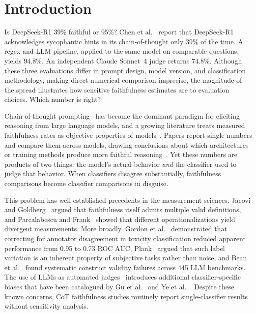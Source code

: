 \section{Introduction}

Is DeepSeek-R1 39\% faithful or 95\%? Chen et al.~\cite{chen2025reasoning} report that DeepSeek-R1 acknowledges sycophantic hints in its chain-of-thought only 39\% of the time. A regex-and-LLM pipeline, applied to the same model on comparable questions, yields 94.8\%. An independent Claude Sonnet~4 judge returns 74.8\%. Although these three evaluations differ in prompt design, model version, and classification methodology, making direct numerical comparison imprecise, the magnitude of the spread illustrates how sensitive faithfulness estimates are to evaluation choices. Which number is right?

Chain-of-thought prompting~\cite{wei2022cot} has become the dominant paradigm for eliciting reasoning from large language models, and a growing literature treats measured faithfulness rates as objective properties of models~\cite{turpin2023unfaithful, lanham2023measuring, chen2025reasoning}. Papers report single numbers and compare them across models, drawing conclusions about which architectures or training methods produce more faithful reasoning~\cite{feng2025more, arcuschin2025wild}. Yet these numbers are products of two things: the model's actual behavior \emph{and} the classifier used to judge that behavior. When classifiers disagree substantially, faithfulness comparisons become classifier comparisons in disguise.

This problem has well-established precedents in the measurement sciences. Jacovi and Goldberg~\cite{jacovi2020faithfulness} argued that faithfulness itself admits multiple valid definitions, and Parcalabescu and Frank~\cite{parcalabescu2023measuring} showed that different operationalizations yield divergent measurements. More broadly, Gordon et al.~\cite{gordon2021disagreement} demonstrated that correcting for annotator disagreement in toxicity classification reduced apparent performance from 0.95 to 0.73 ROC AUC, Plank~\cite{plank2022problem} argued that such label variation is an inherent property of subjective tasks rather than noise, and Bean et al.~\cite{bean2025measuring} found systematic construct validity failures across 445 LLM benchmarks. The use of LLMs as automated judges~\cite{zheng2023judging} introduces additional classifier-specific biases that have been catalogued by Gu et al.~\cite{gu2024survey} and Ye et al.~\cite{ye2024justice}. Despite these known concerns, CoT faithfulness studies routinely report single-classifier results without sensitivity analysis.

